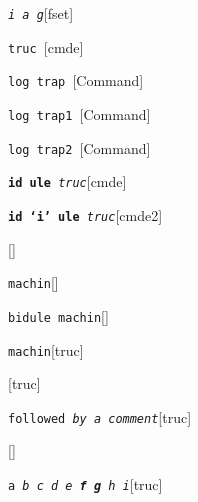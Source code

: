 \documentclass{book}
\begin{document}
\begin{titlepage}
\noindent\texttt{\textsl{i} \bgroup{}\normalfont{}\textsl{a g}\egroup{}}\hfill[fset]



%
%
\noindent\texttt{truc \bgroup{}\normalfont{}\textsl{}\egroup{}}\hfill[cmde]



%
\noindent\texttt{log trap \bgroup{}\normalfont{}\textsl{}\egroup{}}\hfill[Command]



%
\noindent\texttt{log trap1 \bgroup{}\normalfont{}\textsl{}\egroup{}}\hfill[Command]



%
\noindent\texttt{log trap2 \bgroup{}\normalfont{}\textsl{}\egroup{}}\hfill[Command]



%
\noindent\texttt{\textbf{id ule} \bgroup{}\normalfont{}\textsl{truc}\egroup{}}\hfill[cmde]



%
\noindent\texttt{\textbf{id `\texttt{i}' ule} \bgroup{}\normalfont{}\textsl{truc}\egroup{}}\hfill[cmde2]



%
\noindent\texttt{}\hfill[]



\noindent\texttt{machin}\hfill[]



%
\noindent\texttt{bidule machin}\hfill[]



%
\noindent\texttt{machin}\hfill[truc]



%
\noindent\texttt{}\hfill[truc]



\noindent\texttt{followed \bgroup{}\normalfont{}\textsl{by a comment}\egroup{}}\hfill[truc]



%
\noindent\texttt{}\hfill[]



\noindent\texttt{a \bgroup{}\normalfont{}\textsl{b c d e \textbf{f g} h i}\egroup{}}\hfill[truc]




\end{titlepage}
\end{document}
